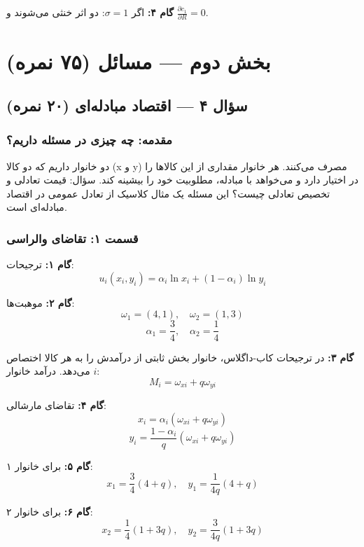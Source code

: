 \documentclass[12pt,a4paper]{article}
\begin{document}
\textbf{گام ۴:} اگر $\sigma = 1$: دو اثر خنثی می‌شوند و $\frac{\partial c_1}{\partial R} = 0$.

\section{بخش دوم — مسائل (۷۵ نمره)}

\subsection{سؤال ۴ — اقتصاد مبادله‌ای (۲۰ نمره)}

\subsubsection{مقدمه: چه چیزی در مسئله داریم؟}

دو خانوار داریم که دو کالا (x و y) مصرف می‌کنند. هر خانوار مقداری از این کالاها را در اختیار دارد و می‌خواهد با مبادله، مطلوبیت خود را بیشینه کند. سؤال: قیمت تعادلی و تخصیص تعادلی چیست؟ این مسئله یک مثال کلاسیک از تعادل عمومی در اقتصاد مبادله‌ای است.

\subsubsection{قسمت ۱: تقاضای والراسی}

\textbf{گام ۱:} ترجیحات:
\[
	u_i(x_i, y_i) = \alpha_i \ln x_i + (1 - \alpha_i) \ln y_i
\]

\textbf{گام ۲:} موهبت‌ها:
\[
	\omega_1 = (4, 1), \quad \omega_2 = (1, 3)
\]
\[
	\alpha_1 = \frac{3}{4}, \quad \alpha_2 = \frac{1}{4}
\]

\textbf{گام ۳:} در ترجیحات کاب-داگلاس، خانوار بخش ثابتی از درآمدش را به هر کالا اختصاص می‌دهد. درآمد خانوار $i$:
\[
	M_i = \omega_{xi} + q \omega_{yi}
\]

\textbf{گام ۴:} تقاضای مارشالی:
\[
	x_i = \alpha_i (\omega_{xi} + q \omega_{yi})
\]
\[
	y_i = \frac{1 - \alpha_i}{q} (\omega_{xi} + q \omega_{yi})
\]

\textbf{گام ۵:} برای خانوار ۱:
\[
	x_1 = \frac{3}{4}(4 + q), \quad y_1 = \frac{1}{4q}(4 + q)
\]

\textbf{گام ۶:} برای خانوار ۲:
\[
	x_2 = \frac{1}{4}(1 + 3q), \quad y_2 = \frac{3}{4q}(1 + 3q)
\]
\end{document}

